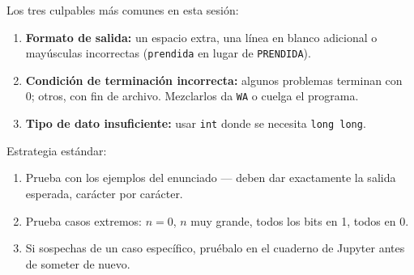 \documentclass[12pt, oneside]{article}
\begin{document}
\begin{notaprofesor}
  Los tres culpables más comunes en esta sesión:
  \begin{enumerate}
    \item \textbf{Formato de salida:} un espacio extra, una línea en blanco
          adicional o mayúsculas incorrectas (\texttt{prendida} en lugar de
          \texttt{PRENDIDA}).
    \item \textbf{Condición de terminación incorrecta:} algunos problemas
          terminan con 0; otros, con fin de archivo.  Mezclarlos da \texttt{WA}
          o cuelga el programa.
    \item \textbf{Tipo de dato insuficiente:} usar \texttt{int} donde se
          necesita \texttt{long long}.
  \end{enumerate}
\end{notaprofesor}

\begin{notaprofesor}
  Estrategia estándar:
  \begin{enumerate}
    \item Prueba con los ejemplos del enunciado — deben dar exactamente la
          salida esperada, carácter por carácter.
    \item Prueba casos extremos: $n=0$, $n$ muy grande, todos los bits en 1,
          todos en 0.
    \item Si sospechas de un caso específico, pruébalo en el cuaderno de
          Jupyter antes de someter de nuevo.
  \end{enumerate}
\end{notaprofesor}
\end{document}
